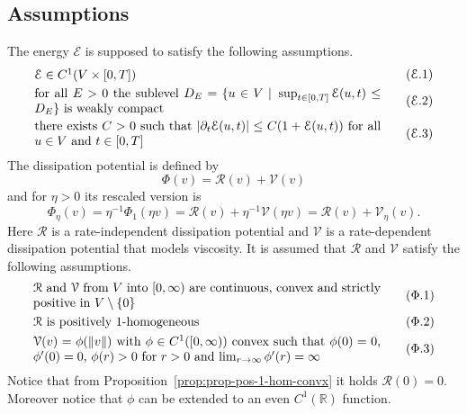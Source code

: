 \subsection{Assumptions}

The energy $\mathcal{E}$ is supposed to satisfy the following assumptions.
\begin{gather}
\label{eqn:energy-regularity}
\parbox[c]{0.8\textwidth}{$\mathcal{E}\in C^1(V\times[0,T])$}
\tag{$\mathcal{E}$.1}
\\
\label{eqn:energy-coercivity}
\parbox[c]{0.8\textwidth}{for all $E>0$ the sublevel $D_E=\{u\in V\;|\;\sup_{t\in[0,T]}\mathcal{E}(u,t)\le D_E\}$ is weakly compact}
\tag{$\mathcal{E}$.2}
\\
\label{eqn:power-control}
\parbox[c]{0.8\textwidth}{there exists $C>0$ such that $|\partial_t\mathcal{E}(u,t)|\le C(1+\mathcal{E}(u,t))$ for all $u\in V$ and $t\in[0,T]$}
\tag{$\mathcal{E}$.3}
\end{gather}
The dissipation potential is defined by
\begin{equation*}
\Phi(v)=\mathcal{R}(v)+\mathcal{V}(v)
\end{equation*}
and for $\eta>0$ its rescaled version is
\begin{equation*}
\Phi_\eta(v)=\eta^{-1}\Phi_1(\eta v)=\mathcal{R}(v)+\eta^{-1}\mathcal{V}(\eta v)=\mathcal{R}(v)+\mathcal{V}_\eta(v).
\end{equation*}
Here $\mathcal{R}$ is a rate-independent dissipation potential and $\mathcal{V}$ is a rate-dependent dissipation potential that models viscosity. It is assumed that $\mathcal{R}$ and $\mathcal{V}$ satisfy the following assumptions.
\begin{gather}
\label{eqn:bv-dissipation-1}
\parbox[c]{0.8\textwidth}{$\mathcal{R}$ and $\mathcal{V}$ from $V$ into $[0,\infty)$ are continuous, convex and strictly positive in $V\setminus\{0\}$}
\tag{$\Phi$.1}
\\
\label{eqn:bv-dissipation-2}
\parbox[c]{0.8\textwidth}{$\mathcal{R}$ is positively 1-homogeneous}
\tag{$\Phi$.2}
\\
\label{eqn:bv-dissipation-3}
\parbox[c]{0.8\textwidth}{$\mathcal{V}(v)=\phi(\norm{v})$ with $\phi\in C^1([0,\infty))$ convex such that $\phi(0)=0$, $\phi'(0)=0$, $\phi(r)>0$ for $r>0$ and $\lim_{r\to\infty}\phi'(r)=\infty$}
\tag{$\Phi$.3}
\end{gather}
Notice that from Proposition~\ref{prop:prop-pos-1-hom-convx} it holds $\mathcal{R}(0)=0$. Moreover notice that $\phi$ can be extended to an even $C^1(\mathbb{R})$ function.

